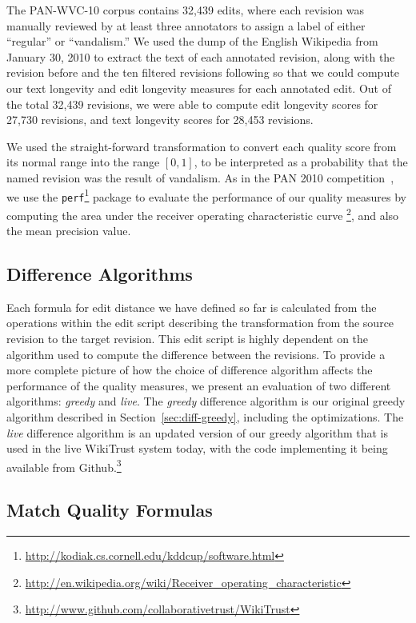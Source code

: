 The PAN-WVC-10 corpus contains 32,439 edits, where each revision was
manually reviewed by at least three annotators to assign a label
of either ``regular'' or ``vandalism.''
We used the dump of the English Wikipedia from January 30, 2010
to extract the text of each annotated revision, along with the revision
before and the ten filtered revisions following so that we could compute
our text longevity and edit longevity measures for each annotated edit.
Out of the total 32,439 revisions, we were able to compute
edit longevity scores for 27,730 revisions, and text longevity
scores for 28,453 revisions.

We used the straight-forward transformation to convert
each quality score from its normal range into the range
$[0,1]$, to be interpreted as a probability that the named
revision was the result of vandalism.
As in the PAN 2010 competition~\cite{Potthast2010b}, we use the
\texttt{perf}\footnote{\url{http://kodiak.cs.cornell.edu/kddcup/software.html}}
package to evaluate the performance of our quality measures
by computing the area under the receiver operating characteristic
curve \footnote{\url{http://en.wikipedia.org/wiki/Receiver_operating_characteristic}},
and also the mean precision value.

\subsection{Difference Algorithms}

Each formula for edit distance we have defined so far is calculated
from the operations within the edit script describing the transformation
from the source revision to the target revision.
This edit script is highly dependent on the algorithm used to
compute the difference between the revisions.
To provide a more complete picture of how the choice of difference
algorithm affects the performance of the quality measures,
we present an evaluation of two different algorithms:
\textit{greedy} and \textit{live}.
The \textit{greedy} difference algorithm is our original greedy
algorithm described in Section~\ref{sec:diff-greedy}, including
the optimizations.
The \textit{live} difference algorithm is an updated version of
our greedy algorithm that is used in the live WikiTrust system today,
with the code implementing it being available from
Github.\footnote{\url{http://www.github.com/collaborativetrust/WikiTrust}}

\subsection{Match Quality Formulas}

